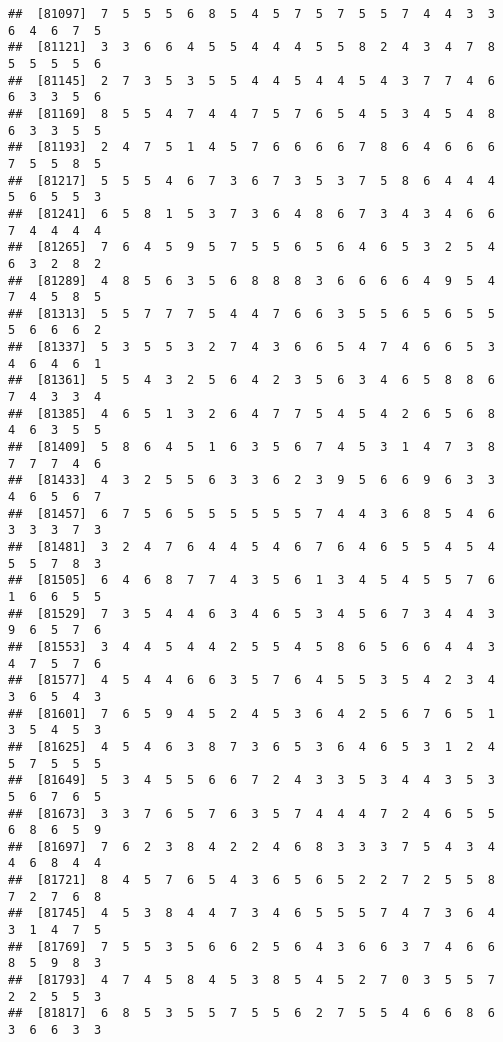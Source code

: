 \documentclass[
]{book}
\begin{document}
\begin{verbatim}
##  [81097]  7  5  5  5  6  8  5  4  5  7  5  7  5  5  7  4  4  3  3  6  4  6  7  5
##  [81121]  3  3  6  6  4  5  5  4  4  4  5  5  8  2  4  3  4  7  8  5  5  5  5  6
##  [81145]  2  7  3  5  3  5  5  4  4  5  4  4  5  4  3  7  7  4  6  6  3  3  5  6
##  [81169]  8  5  5  4  7  4  4  7  5  7  6  5  4  5  3  4  5  4  8  6  3  3  5  5
##  [81193]  2  4  7  5  1  4  5  7  6  6  6  6  7  8  6  4  6  6  6  7  5  5  8  5
##  [81217]  5  5  5  4  6  7  3  6  7  3  5  3  7  5  8  6  4  4  4  5  6  5  5  3
##  [81241]  6  5  8  1  5  3  7  3  6  4  8  6  7  3  4  3  4  6  6  7  4  4  4  4
##  [81265]  7  6  4  5  9  5  7  5  5  6  5  6  4  6  5  3  2  5  4  6  3  2  8  2
##  [81289]  4  8  5  6  3  5  6  8  8  8  3  6  6  6  6  4  9  5  4  7  4  5  8  5
##  [81313]  5  5  7  7  7  5  4  4  7  6  6  3  5  5  6  5  6  5  5  5  6  6  6  2
##  [81337]  5  3  5  5  3  2  7  4  3  6  6  5  4  7  4  6  6  5  3  4  6  4  6  1
##  [81361]  5  5  4  3  2  5  6  4  2  3  5  6  3  4  6  5  8  8  6  7  4  3  3  4
##  [81385]  4  6  5  1  3  2  6  4  7  7  5  4  5  4  2  6  5  6  8  4  6  3  5  5
##  [81409]  5  8  6  4  5  1  6  3  5  6  7  4  5  3  1  4  7  3  8  7  7  7  4  6
##  [81433]  4  3  2  5  5  6  3  3  6  2  3  9  5  6  6  9  6  3  3  4  6  5  6  7
##  [81457]  6  7  5  6  5  5  5  5  5  5  7  4  4  3  6  8  5  4  6  3  3  3  7  3
##  [81481]  3  2  4  7  6  4  4  5  4  6  7  6  4  6  5  5  4  5  4  5  5  7  8  3
##  [81505]  6  4  6  8  7  7  4  3  5  6  1  3  4  5  4  5  5  7  6  1  6  6  5  5
##  [81529]  7  3  5  4  4  6  3  4  6  5  3  4  5  6  7  3  4  4  3  9  6  5  7  6
##  [81553]  3  4  4  5  4  4  2  5  5  4  5  8  6  5  6  6  4  4  3  4  7  5  7  6
##  [81577]  4  5  4  4  6  6  3  5  7  6  4  5  5  3  5  4  2  3  4  3  6  5  4  3
##  [81601]  7  6  5  9  4  5  2  4  5  3  6  4  2  5  6  7  6  5  1  3  5  4  5  3
##  [81625]  4  5  4  6  3  8  7  3  6  5  3  6  4  6  5  3  1  2  4  5  7  5  5  5
##  [81649]  5  3  4  5  5  6  6  7  2  4  3  3  5  3  4  4  3  5  3  5  6  7  6  5
##  [81673]  3  3  7  6  5  7  6  3  5  7  4  4  4  7  2  4  6  5  5  6  8  6  5  9
##  [81697]  7  6  2  3  8  4  2  2  4  6  8  3  3  3  7  5  4  3  4  4  6  8  4  4
##  [81721]  8  4  5  7  6  5  4  3  6  5  6  5  2  2  7  2  5  5  8  7  2  7  6  8
##  [81745]  4  5  3  8  4  4  7  3  4  6  5  5  5  7  4  7  3  6  4  3  1  4  7  5
##  [81769]  7  5  5  3  5  6  6  2  5  6  4  3  6  6  3  7  4  6  6  8  5  9  8  3
##  [81793]  4  7  4  5  8  4  5  3  8  5  4  5  2  7  0  3  5  5  7  2  2  5  5  3
##  [81817]  6  8  5  3  5  5  7  5  5  6  2  7  5  5  4  6  6  8  6  3  6  6  3  3

\end{verbatim}
\end{document}
